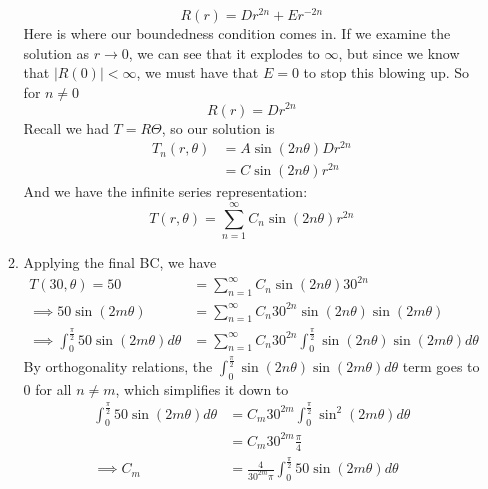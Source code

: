 \documentclass[12pt]{article}
\numberwithin{equation}{section}
\begin{document}
\begin{enumerate}
\begin{enumerate}
            \begin{equation*}
                R(r)=Dr^{2n}+Er^{-2n}
            \end{equation*}
            Here is where our boundedness condition comes in. If we examine the solution as $r\rightarrow 0$, we can see that it explodes 
            to $\infty$, but since we know that $|R(0)|<\infty$, we must have that $E=0$ to stop this blowing up. So for $n\neq0$
            \begin{equation*}
                R(r)=Dr^{2n}
            \end{equation*}
            Recall we had $T=R\Theta$, so our solution is
            \begin{align*}
                T_n(r,\theta)&=A\sin(2n\theta)Dr^{2n}\\
                &=C\sin(2n\theta)r^{2n}
            \end{align*}
            And we have the infinite series representation:
            \begin{equation*}
                T(r,\theta)=\sum_{n=1}^\infty C_n \sin(2n\theta)r^{2n}
            \end{equation*}

            \item Applying the final BC, we have
            \begin{align*}
                T(30,\theta)=50&=\sum_{n=1}^\infty C_n \sin(2n\theta)30^{2n}\\
                \implies 50 \sin(2m\theta)&=\sum_{n=1}^\infty C_n 30^{2n}\sin(2n\theta)\sin(2m\theta)\\
                \implies \int_0^{\frac{\pi}{2}}50 \sin(2m\theta) d\theta&= \sum_{n=1}^\infty C_n 30^{2n}\int_0^{\frac{\pi}{2}}\sin(2n\theta)\sin(2m\theta)d\theta
            \end{align*}
            By orthogonality relations, the $\int_0^{\frac{\pi}{2}}\sin(2n\theta)\sin(2m\theta)d\theta$ term goes to 0 for all $n\neq m$, which simplifies it down to
            \begin{align*}
                \int_0^{\frac{\pi}{2}}50 \sin(2m\theta) d\theta&=C_m 30^{2m}\int_0^{\frac{\pi}{2}}\sin^2(2m\theta)d\theta\\
                &=C_m 30^{2m} \frac{\pi}{4}\\
                \implies C_m&= \frac{4}{30^{2m}\pi} \int_0^{\frac{\pi}{2}}50 \sin(2m\theta) d\theta
            \end{align*}
        \end{enumerate}
        

\end{enumerate}
\end{document}
